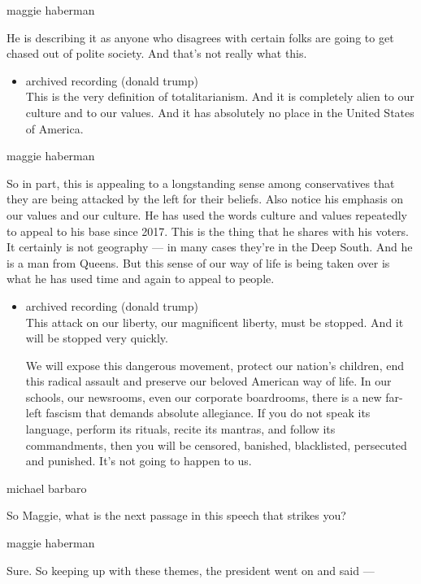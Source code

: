 maggie haberman

He is describing it as anyone who disagrees with certain folks are going
to get chased out of polite society. And that's not really what this.

\begin{itemize}
\tightlist
\item
  archived recording (donald trump)\\
  This is the very definition of totalitarianism. And it is completely
  alien to our culture and to our values. And it has absolutely no place
  in the United States of America.
\end{itemize}

maggie haberman

So in part, this is appealing to a longstanding sense among
conservatives that they are being attacked by the left for their
beliefs. Also notice his emphasis on our values and our culture. He has
used the words culture and values repeatedly to appeal to his base since
2017. This is the thing that he shares with his voters. It certainly is
not geography --- in many cases they're in the Deep South. And he is a
man from Queens. But this sense of our way of life is being taken over
is what he has used time and again to appeal to people.

\begin{itemize}
\item
  archived recording (donald trump)\\
  This attack on our liberty, our magnificent liberty, must be stopped.
  And it will be stopped very quickly.

  We will expose this dangerous movement, protect our nation's children,
  end this radical assault and preserve our beloved American way of
  life. In our schools, our newsrooms, even our corporate boardrooms,
  there is a new far-left fascism that demands absolute allegiance. If
  you do not speak its language, perform its rituals, recite its
  mantras, and follow its commandments, then you will be censored,
  banished, blacklisted, persecuted and punished. It's not going to
  happen to us.
\end{itemize}

michael barbaro

So Maggie, what is the next passage in this speech that strikes you?

maggie haberman

Sure. So keeping up with these themes, the president went on and said
---

